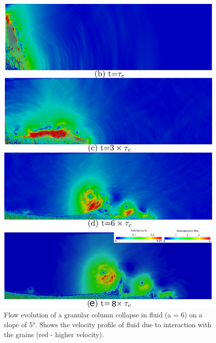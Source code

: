 \documentclass[epj,twocolumn]{webofc}
\begin{document}
\begin{figure}[htpb]
\centering
\includegraphics[width=0.9\linewidth]{figs/lbm_dem_a6_slope5}
\caption[Flow evolution of a granular column collapse in fluid (a = 6) on a 
slope of 5\si{\degree}]{Flow evolution of a granular column collapse in fluid 
(a = 6) on a slope of 5\si{\degree}. Shows the velocity profile of fluid due to 
interaction with the grains (red - higher velocity).}
\label{fig:a6_slope_snapshots}
\end{figure}
\end{document}
